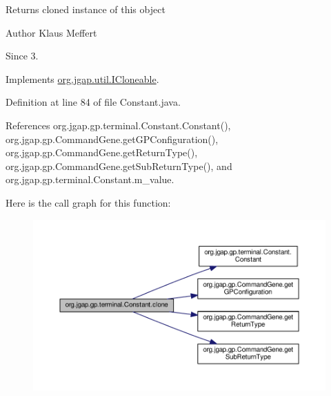 \begin{DoxyReturn}{Returns}
cloned instance of this object
\end{DoxyReturn}
\begin{DoxyAuthor}{Author}
Klaus Meffert 
\end{DoxyAuthor}
\begin{DoxySince}{Since}
3. 
\end{DoxySince}


Implements \hyperlink{interfaceorg_1_1jgap_1_1util_1_1_i_cloneable_aa7e7d62077e6428ad7904932b1b4f7d5}{org.\-jgap.\-util.\-I\-Cloneable}.



Definition at line 84 of file Constant.\-java.



References org.\-jgap.\-gp.\-terminal.\-Constant.\-Constant(), org.\-jgap.\-gp.\-Command\-Gene.\-get\-G\-P\-Configuration(), org.\-jgap.\-gp.\-Command\-Gene.\-get\-Return\-Type(), org.\-jgap.\-gp.\-Command\-Gene.\-get\-Sub\-Return\-Type(), and org.\-jgap.\-gp.\-terminal.\-Constant.\-m\-\_\-value.



Here is the call graph for this function\-:
\nopagebreak
\begin{figure}[H]
\begin{center}
\leavevmode
\includegraphics[width=350pt]{classorg_1_1jgap_1_1gp_1_1terminal_1_1_constant_ad436f02d1be2ee7ae2ccf29f46408fa9_cgraph}
\end{center}
\end{figure}


